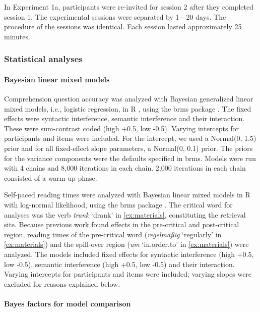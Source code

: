 \documentclass[a4paper, man, floatsintext]{apa7}
\begin{document}
In Experiment 1a, participants were re-invited for session 2 after they completed session 1. The experimental sessions were separated by 1 - 20 days. The procedure of the sessions was identical. Each session lasted approximately 25 minutes.

\subsubsection{Statistical analyses}

\paragraph{Bayesian linear mixed models}
Comprehension question accuracy was analyzed with Bayesian generalized linear mixed models, i.e., logistic regression, in R \citep{r}, using the brms package \citep{brms}. The fixed effects were syntactic interference, semantic interference and their interaction. These were sum-contrast coded (high +0.5, low -0.5). Varying intercepts for participants and items were included. For the intercept, we used a Normal(0, 1.5) prior and  for all fixed-effect slope parameters, a Normal(0, 0.1) prior. The priors for the variance components were the defaults specified in brms. Models were run with 4 chains and 8,000 iterations in each chain. 2,000 iterations in each chain consisted of a warm-up phase. 

Self-paced reading times were analyzed with Bayesian linear mixed models in R \citep{r} with log-normal likelihood, using the brms package \citep{brms}. The critical word for analyses was the verb \textit{trank} `drank' in \ref{ex:materials}, constituting the retrieval site. Because previous work found effects in the pre-critical and post-critical region, reading times of the pre-critical word (\textit{regelmäßig} `regularly' in \ref{ex:materials}) and the spill-over region (\textit{um} `in.order.to' in \ref{ex:materials}) were analyzed. 
The models included fixed effects for syntactic interference (high +0.5, low -0.5), semantic interference (high +0.5, low -0.5) and their interaction.  Varying intercepts for participants and items were included; varying slopes were excluded for reasons explained below. 

\paragraph{Bayes factors for model comparison}
\end{document}
